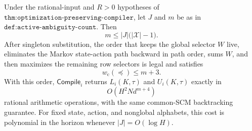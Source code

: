 Under the rational-input and \(R>0\) hypotheses of \(\texttt{thm:optimization-preserving-compiler}\), let \(J\) and \(m\) be as in \(\texttt{def:active-ambiguity-count}\).  Then
\[
 m\le |J|\bigl(|\mathcal X|-1\bigr).
\]
After singleton substitution, the order that keeps the global selector \(W\) live, eliminates the Markov state-action path backward in path order, sums \(W\), and then maximizes the remaining row selectors is legal and satisfies
\[
 w_{\mathrm c}(\preceq)\le m+3.
\]
With this order, \(\mathsf{Compile}_i\) returns \(L_i(K,\tau)\) and \(U_i(K,\tau)\) exactly in
\[
 O\!\left(H^2N d^{m+4}\right)
\]
rational arithmetic operations, with the same common-SCM backtracking guarantee.  For fixed state, action, and nonglobal alphabets, this cost is polynomial in the horizon whenever \(|J|=O(\log H)\).